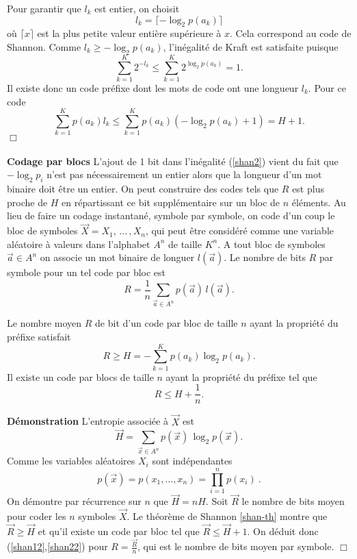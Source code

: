 Pour garantir que $l_k$ est entier, on choisit
\[
l_k = \lceil - \log_2 p(a_k) \rceil 
\]
o\`u $\lceil x \rceil$ est la plus petite valeur enti\`ere
sup\'erieure \`a $x$. 
Cela correspond au code de Shannon.
Comme $l_k \geq - \log_2 p(a_k)$, l'in\'egalit\'e
de Kraft est satisfaite puisque
\[
\sum_{k=1}^K 2^{-l_k} \leq \sum_{k=1}^K 2^{\log_2 p(a_k)} = 1 .
\]
Il existe donc un code pr\'efixe dont les mots de code
ont une longueur $l_k$. Pour ce code
\[
\sum_{k=1}^K p(a_k) l_k \leq 
\sum_{k=1}^K p(a_k) (-\log_2 p(a_k) + 1) = H + 1 .
\]
$\Box$
\\
\\
{\bf Codage par blocs}
L'ajout de 1 bit dans l'in\'egalit\'e (\ref{shan2}) 
vient du fait que $-\log_2 p_i$ n'est pas n\'ecessairement
un entier alors que la longueur d'un mot binaire doit
\^etre un entier. On peut construire des codes tels que 
$R$ est plus proche de $H$ en r\'epartissant ce bit 
suppl\'ementaire sur un bloc de $n$ \'el\'ements.
Au lieu de faire un codage instantan\'e, symbole par symbole,
on code d'un coup le bloc de symboles 
$\vec X = X_1 , \,...\,,X_n$, qui peut \^etre consid\'er\'e
comme une variable al\'eatoire \`a valeurs dans 
l'alphabet $A^n$ de taille $K^n$.
A tout bloc de symboles $\vec a \in A^n$ on associe un
mot binaire de longuer $l(\vec a)$. Le nombre de bits
$R$ par symbole pour un tel code par bloc est
\[
R = \frac 1 n \sum_{\vec a \in A^n} p(\vec a) \, l(\vec a) .
\]


\begin{proposition} 
\label{shan-prop}
Le nombre moyen $R$ de bit d'un code 
par bloc de taille $n$ ayant la propri\'et\'e du
pr\'efixe satisfait
\begin{equation}
\label{shan12}
R \geq H = - \sum_{k=1}^K p(a_k) \log_2 p(a_k) . 
\end{equation}
Il existe un code par blocs de taille
$n$ ayant la propri\'et\'e du pr\'efixe tel que
\begin{equation}
\label{shan22}
R \leq H + \frac 1 n.
\end{equation}
\end{proposition} 

{\bf D\'emonstration}
L'entropie associ\'ee \`a $\vec X$ est
\[
\vec H = \sum_{\vec x \in A^n} p(\vec x) \, \log_2 p(\vec x) .
\]
Comme les variables al\'eatoires $X_i$ sont ind\'ependantes
\[
p(\vec x) = p(x_1, ... , x_n) = \prod_{i=1}^n p(x_i)~.
\]
On d\'emontre par r\'ecurrence sur $n$ que
$\vec H = n H$. Soit $\vec R$ le nombre de bits moyen
pour coder les $n$ symboles $\vec X$. Le th\'eor\`eme
de Shannon \ref{shan-th} montre que $\vec R \geq \vec H$
et qu'il existe un code par bloc tel que
$\vec R \leq \vec H + 1$. On d\'eduit donc 
(\ref{shan12},\ref{shan22}) pour $R = \frac{\vec R} n$, qui
est le nombre de bits moyen par symbole.
$\Box$

